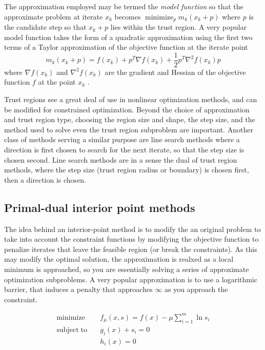 The approximation employed may be termed the \emph{model function} so that the approximate problem at iterate $x_k$ becomes $\operatorname{minimize}_p m_k(x_k + p)$ where $p$ is the candidate step so that $x_k + p$ lies within the trust region. A very popular model function takes the form of a quadratic approximation using the first two terms of a Taylor approximation of the objective function at the iterate point
\begin{equation}
  m_k(x_k + p) = f(x_k) + p^T \nabla f(x_k) + \frac{1}{2} p^T \nabla^2 f(x_k) p
\end{equation}
where $\nabla f(x_k)$ and $\nabla^2 f(x_k)$ are the gradient and Hessian of the objective function $f$ at the point $x_k$ \citep{More83}.

Trust regions see a great deal of use in nonlinear optimization methods, and can be modified for constrained optimization. Beyond the choice of approximation and trust region type, choosing the region size and shape, the step size, and the method used to solve even the trust region subproblem are important. Another class of methods serving a similar purpose are line search methods where a direction is first chosen to search for the next iterate, so that the step size is chosen second. Line search methods are in a sense the dual of trust region methods, where the step size (trust region radius or boundary) is chosen first, then a direction is chosen.

\subsection{Primal-dual interior point methods}
The idea behind an interior-point method is to modify the an original problem to take into account the constraint functions by modifying the objective function to penalize iterates that leave the feasible region (or break the constraints). As this may modify the optimal solution, the approximation is realxed as a local minimum is approached, so you are essentially solving a series of approximate optimization subproblems. A very popular approximation is to use a logarithmic barrier, that induces a penalty that approaches $\infty$ as you approach the constraint.

\begin{align}
\mathrm{minimize} \quad & f_\mu(x,s) = f(x) - \mu \sum_{i=1}^{m} \ln s_i \nonumber \\
\mathrm{subject\;to} \quad & g_i(x) + s_i = 0 \\
                           & h_i(x) = 0 \nonumber
\end{align}

